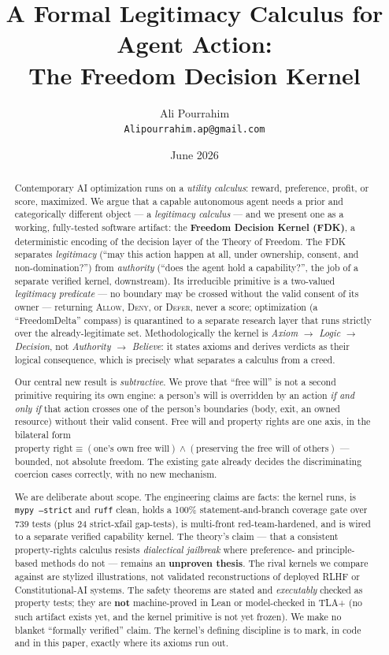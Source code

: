 \documentclass[11pt]{article}
\title{A Formal Legitimacy Calculus for Agent Action:\\
The Freedom Decision Kernel}
\author{Ali Pourrahim \\ \texttt{Alipourrahim.ap@gmail.com}}
\date{June 2026}
\newcommand{\Allow}{\textsc{Allow}}
\newcommand{\Deny}{\textsc{Deny}}
\newcommand{\Defer}{\textsc{Defer}}
\begin{document}
\maketitle

\begin{abstract}
Contemporary AI optimization runs on a \emph{utility calculus}: reward, preference,
profit, or score, maximized. We argue that a capable autonomous agent needs a prior and
categorically different object --- a \emph{legitimacy calculus} --- and we present one as a
working, fully-tested software artifact: the \textbf{Freedom Decision Kernel (FDK)}, a
deterministic encoding of the decision layer of the Theory of Freedom. The FDK separates
\emph{legitimacy} (``may this action happen at all, under ownership, consent, and
non-domination?'') from \emph{authority} (``does the agent hold a capability?'', the job of
a separate verified kernel, downstream). Its irreducible primitive is a two-valued
\emph{legitimacy predicate} --- no boundary may be crossed without the valid consent of its
owner --- returning \Allow, \Deny, or \Defer, never a score; optimization (a ``FreedomDelta''
compass) is quarantined to a separate research layer that runs strictly over the
already-legitimate set. Methodologically the kernel is \emph{Axiom $\to$ Logic $\to$
Decision}, not \emph{Authority $\to$ Believe}: it states axioms and derives verdicts as
their logical consequence, which is precisely what separates a calculus from a creed.

Our central new result is \emph{subtractive}. We prove that ``free will'' is not a second
primitive requiring its own engine: a person's will is overridden by an action \emph{if and
only if} that action crosses one of the person's boundaries (body, exit, an owned resource)
without their valid consent. Free will and property rights are one axis, in the bilateral
form $\text{property right} \equiv (\text{one's own free will}) \wedge (\text{preserving the
free will of others})$ --- bounded, not absolute freedom. The existing gate already decides
the discriminating coercion cases correctly, with no new mechanism.

We are deliberate about scope. The engineering claims are facts: the kernel runs, is
\texttt{mypy~--strict} and \texttt{ruff} clean, holds a 100\% statement-and-branch coverage
gate over 739 tests (plus 24 strict-xfail gap-tests), is multi-front red-team-hardened, and is
wired to a separate verified capability
kernel. The theory's claim --- that a consistent property-rights calculus resists
\emph{dialectical jailbreak} where preference- and principle-based methods do not ---
remains an \textbf{unproven thesis}. The rival kernels we compare against are stylized
illustrations, not validated reconstructions of deployed RLHF or Constitutional-AI systems.
The safety theorems are stated and \emph{executably} checked as property tests; they are
\textbf{not} machine-proved in Lean or model-checked in TLA+ (no such artifact exists yet,
and the kernel primitive is not yet frozen). We make no blanket ``formally verified''
claim. The kernel's defining discipline is to mark, in code and in this paper, exactly where
its axioms run out.
\end{abstract}
\end{document}
